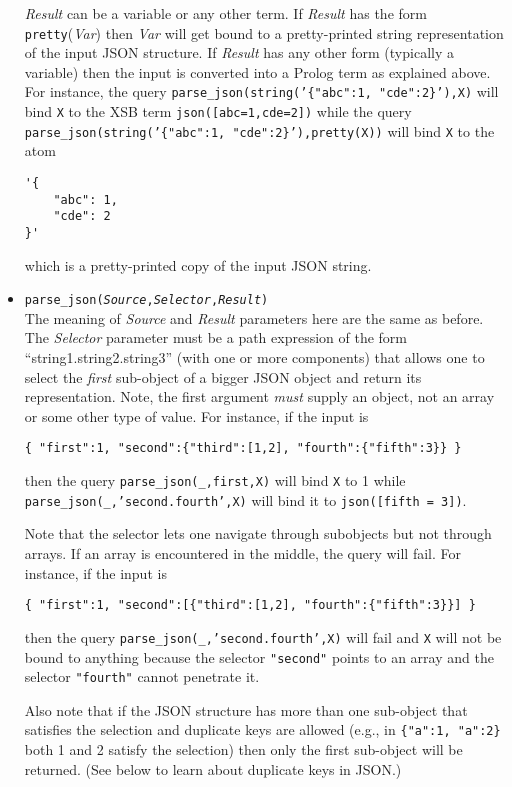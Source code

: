 \begin{itemize}
  \emph{Result} can be a variable or any other term. If  \emph{Result}
  has the form \texttt{pretty}(\emph{Var})  then \emph{Var}
  will get bound to a pretty-printed string representation of the input
  JSON structure. If \emph{Result} has any other form (typically a
  variable) then the input is converted into a Prolog term as explained
  above.
  For instance, the query 
  \texttt{parse\_json(string('\{"abc":1, "cde":2\}'),X)}
  will bind \texttt{X} to the XSB term \texttt{json([abc=1,cde=2])}
  while the query  \texttt{parse\_json(string('\{"abc":1,
    "cde":2\}'),pretty(X))}  will bind \texttt{X} to the atom
\begin{verbatim}
'{
    "abc": 1,
    "cde": 2
}'
\end{verbatim}
  which is a pretty-printed copy of the input JSON string.
\item
  \texttt{parse\_json(\emph{Source},\emph{Selector},\emph{Result})}\\
  The meaning of \emph{Source}  and \emph{Result}  parameters here are the
  same as before.
  The \emph{Selector} parameter must be a path expression of the form
  ``string1.string2.string3'' (with one or more components) that allows
  one to select the \emph{first} sub-object of a bigger JSON object and
  return its
  representation. Note, the first argument \emph{must} supply an object, not an
  array or some other type of value. For instance, if the input is
\begin{verbatim}
{ "first":1, "second":{"third":[1,2], "fourth":{"fifth":3}} }  
\end{verbatim}
  then the query \texttt{parse\_json(\_,first,X)} will bind
  \texttt{X} to 1 while
  \\
  \texttt{parse\_json(\_,'second.fourth',X)}
  will bind it to
  \texttt{json([fifth = 3])}.

  Note that the selector lets one navigate through subobjects but not
  through arrays. If an array is encountered in the middle, the query will
  fail. For instance, if the input is
\begin{verbatim}
{ "first":1, "second":[{"third":[1,2], "fourth":{"fifth":3}}] }  
\end{verbatim}
  then the query
  \texttt{parse\_json(\_,'second.fourth',X)}
  will fail and \texttt{X} will not be bound to anything because the
  selector \texttt{"second"} points to an array and the selector
  \texttt{"fourth"} cannot penetrate it. 

  Also note that if the JSON structure has more than one sub-object that
  satisfies the selection and duplicate keys are allowed
  (e.g., in \texttt{\{"a":1, "a":2\}} both 1 and 2 satisfy the selection)
  then only the first sub-object will be returned. (See below to learn about
  duplicate keys in JSON.)


\end{itemize}
